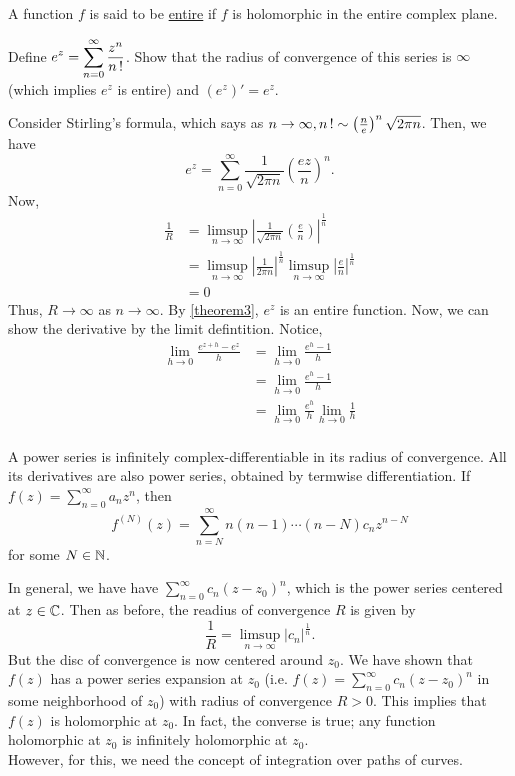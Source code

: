 \documentclass[11pt]{article}
\begin{document}
\begin{definition}
	A function $f$ is said to be \underline{entire} if $f$ is holomorphic in the
	entire complex plane.
\end{definition}
\begin{example}
	Define $\displaystyle e^z = \sum^\infty_{n=0}\frac{z^n}{n\operatorname{!} }$. Show that
	the radius of convergence of this series is $\infty$ (which implies $e^z$ is
	entire) and $(e^z)' = e^z$.
\end{example}
Consider Stirling's formula, which says as $n\to\infty, n\operatorname{!} \sim
\left(\frac{n}{e}\right)^n\sqrt{2\pi n}$. Then, we have
\begin{equation*}
	e^z = \sum^\infty_{n=0} \frac{1}{\sqrt{2\pi n}}\left( \frac{ez}{n}\right)^n.
\end{equation*}
Now,
\begin{align*}
	\frac{1}{R}
	&= \limsup_{n\to\infty}\left| \frac{1}{\sqrt{2\pi
n}}\left(\frac{e}{n}\right)\right|^{\frac{1}{n}}\\
&= \limsup_{n\to\infty}\left| \frac{1}{2\pi n} \right|^{\frac{1}{n}}
\limsup_{n\to\infty}\left| \frac{e}{n} \right|^{\frac{1}{n}}\\
&= 0
\end{align*}
Thus, $R \to \infty$ as $n \to \infty$. By \cref{theorem3}, $e^z$ is an entire
function. Now, we can show the derivative by the limit defintition. Notice,
\begin{align*}
	\lim_{h \to 0}\frac{e^{z+h} - e^z}{h}
	&= \lim_{h \to 0}\frac{e^{h} - 1}{h}\\
	&= \lim_{h \to 0}\frac{e^{h} - 1}{h}\\
	&= \lim_{h \to 0}\frac{e^{h}}{h}\lim_{h \to 0}\frac{1}{h}\\
\end{align*}

\begin{corollary}
	A power series is infinitely complex-differentiable in its radius of
	convergence. All its derivatives are also power series, obtained by termwise
	differentiation. If $\displaystyle f(z) = \sum^\infty_{n=0}a_nz^n$, then
	\begin{equation*}
		f^{(N)}(z) = \sum^\infty_{n=N}n(n-1)\cdots(n-N)c_nz^{n-N}
	\end{equation*}
	for some $N \in \mathbb{N}$.
\end{corollary}
In general, we have have $\displaystyle \sum^\infty_{n=0} c_n(z - z_0)^n$, which
is the power series centered at $z \in \mathbb{C}$. Then as before, the readius of
convergence $R$ is given by
\begin{equation*}
	\frac{1}{R} = \limsup_{n\to\infty} |c_n|^{\frac{1}{n}}.
\end{equation*}
But the disc of convergence is now centered around $z_0$. We have shown that
$f(z)$ has a power series expansion at $z_0$ (i.e. $\displaystyle f(z) =
\sum^\infty_{n=0}c_n(z - z_0)^n$ in some neighborhood of $z_0$) with radius of
convergence $R > 0$. This implies that $f(z)$ is holomorphic at $z_0$. In fact,
the converse is true; any function holomorphic at $z_0$ is infinitely
holomorphic at $z_0$.\\
However, for this, we need the concept of integration over paths of curves.
\end{document}
